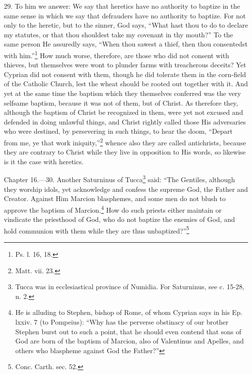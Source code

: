 29. To him we answer: We say that heretics have no authority to baptize in the same sense in which we say that defrauders have no authority to baptize. For not only to the heretic, but to the sinner, God says, ``What hast thou to do to declare my statutes, or that thou shouldest take my covenant in thy mouth?'' To the same person He assuredly says, ``When thou sawest a thief, then thou consentedst with him.''\footnote{\par  Ps. l. 16, 18.} How much worse, therefore, are those who did not consent with thieves, but themselves were wont to plunder farms with treacherous deceits? Yet Cyprian did not consent with them, though he did tolerate them in the corn-field of the Catholic Church, lest the wheat should be rooted out together with it. And yet at the same time the baptism which they themselves conferred was the very selfsame baptism, because it was not of them, but of Christ. As therefore they, although the baptism of Christ be recognized in them, were yet not excused and defended in doing unlawful things, and Christ rightly called those His adversaries who were destined, by persevering in such things, to hear the doom, ``Depart from me, ye that work iniquity,''\footnote{\par  Matt. vii. 23.} whence also they are called antichrists, because they are contrary to Christ while they live in opposition to His words, so likewise is it the case with heretics.


Chapter 16.—30. Another Saturninus of Tucca\footnote{\par  Tucca was in ecclesiastical province of Numidia. For Saturninus, see c. 15-28, n. 2.} said: ``The Gentiles, although they worship idols, yet acknowledge and confess the supreme God, the Father and Creator. Against Him Marcion blasphemes, and some men do not blush to approve the baptism of Marcion.\footnote{\par  He is alluding to Stephen, bishop of Rome, of whom Cyprian says in his Ep. lxxiv. 7 (to Pompeius): ``Why has the perverse obstinacy of our brother Stephen burst out to such a point, that he should even contend that sons of God are born of the baptism of Marcion, also of Valentinus and Apelles, and others who blaspheme against God the Father?''} How do such priests either maintain or vindicate the priesthood of God, who do not baptize the enemies of God, and hold communion with them while they are thus unbaptized?''\footnote{\par  Conc. Carth. sec. 52.}

